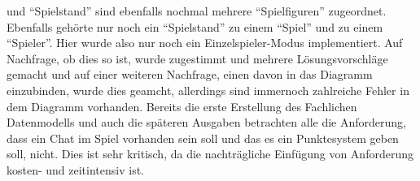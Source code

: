 und ``Spielstand'' sind ebenfalls nochmal mehrere ``Spielfiguren'' zugeordnet. Ebenfalls gehörte nur noch ein ``Spielstand'' zu einem ``Spiel'' und zu einem ``Spieler''.
Hier wurde also nur noch ein Einzelspieler-Modus implementiert. Auf Nachfrage, ob dies so ist, wurde zugestimmt und mehrere Lösungsvorschläge gemacht und auf einer weiteren
Nachfrage, einen davon in das Diagramm einzubinden, wurde dies geamcht, allerdings sind immernoch zahlreiche Fehler in dem Diagramm vorhanden. Bereits die erste Erstellung 
des Fachlichen Datenmodells und auch die späteren Ausgaben betrachten alle die Anforderung, dass ein Chat im Spiel vorhanden sein soll und das es ein Punktesystem 
geben soll, nicht. Dies ist sehr kritisch, da die nachträgliche Einfügung von Anforderung kosten- und zeitintensiv ist.\\

